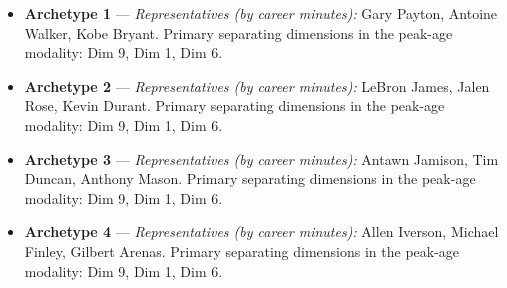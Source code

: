 \begin{itemize}
\item \textbf{Archetype 1} --- \emph{Representatives (by career minutes):} Gary Payton, Antoine Walker, Kobe Bryant. Primary separating dimensions in the peak-age modality: Dim 9, Dim 1, Dim 6.
\item \textbf{Archetype 2} --- \emph{Representatives (by career minutes):} LeBron James, Jalen Rose, Kevin Durant. Primary separating dimensions in the peak-age modality: Dim 9, Dim 1, Dim 6.
\item \textbf{Archetype 3} --- \emph{Representatives (by career minutes):} Antawn Jamison, Tim Duncan, Anthony Mason. Primary separating dimensions in the peak-age modality: Dim 9, Dim 1, Dim 6.
\item \textbf{Archetype 4} --- \emph{Representatives (by career minutes):} Allen Iverson, Michael Finley, Gilbert Arenas. Primary separating dimensions in the peak-age modality: Dim 9, Dim 1, Dim 6.
\end{itemize}

